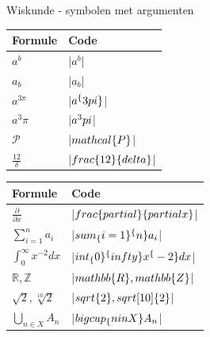 \def\extraslistsep{\hspace{0.5em}\textcolor{red!80!black}{\vrule width 1pt height 0.6\baselineskip\relax}\hspace{0.5em}}
\def\es#1{\adjustbox{scale=0.8}{#1}}

\begin{frame}{Wiskunde - symbolen met argumenten}
	\renewcommand{\arraystretch}{1.5}%
	\begin{tabularx}{0.44\textwidth}{ll}
		\toprule
		Formule & Code\\
		\midrule
		$ a^b $ & \hll|$ a^b $|\\
		$ a_b $ & \hll|$ a_b $| \\
		$ a^{3 \pi} $ & \hll|$ a^\{3 \\pi\} $| \\
		$ a^3 \pi $ & \hll|$ a^3 \\pi $| \\
		$ \mathcal{P} $ & \hll|$ \\mathcal\{P\} $| \\
		$ \frac{12}{\delta} $  & \hll|$ \\frac\{12\}\{\\delta\} $|\\
		\bottomrule
	\end{tabularx}%
	\begin{tabularx}{0.56\textwidth}{ll}
		\toprule
		Formule & Code\\
		\midrule
		$ \frac{\partial}{\partial x} $ & \hll|$ \\frac\{\\partial\}\{\\partial x\} $| \\
		$ \sum_{i=1}^{n}a_i $ & \hll|$ \\sum_\{i=1\}^\{n\}a_i $|\\
		$ \int_{0}^{\infty} x^{-2} dx $  & \hll|$ \\int_\{0\}^\{\\infty\} x^\{-2\} dx $|\\
		$ \mathbb{R}, \mathbb{Z} $ & \hll|$ \\mathbb\{R\}, \\mathbb\{Z\} $| \\
		$ \sqrt{2}, \sqrt[10]{2} $  & \hll|$ \\sqrt\{2\}, \\sqrt[10]\{2\} $| \\
		$ \bigcup_{n \in X} A_n $ & \hll|$ \\bigcup_\{n \\in X\} A_n $| \\
		\bottomrule
	\end{tabularx}%
	\par{}
\end{frame}